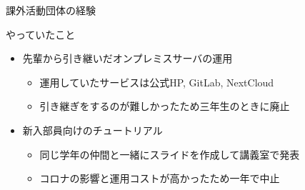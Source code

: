\documentclass[12pt, unicode]{beamer}
\begin{document}
\begin{frame}{課外活動団体の経験}
  \begin{block}{やっていたこと}
    \begin{itemize}
      \item 先輩から引き継いだオンプレミスサーバの運用
      \begin{itemize}
        \item 運用していたサービスは公式HP, GitLab, NextCloud
        \item 引き継ぎをするのが難しかったため三年生のときに廃止
      \end{itemize}
      \item 新入部員向けのチュートリアル
      \begin{itemize}
        \item 同じ学年の仲間と一緒にスライドを作成して講義室で発表
        \item コロナの影響と運用コストが高かったため一年で中止
      \end{itemize}
    \end{itemize}
  \end{block}
\end{frame}
\end{document}
